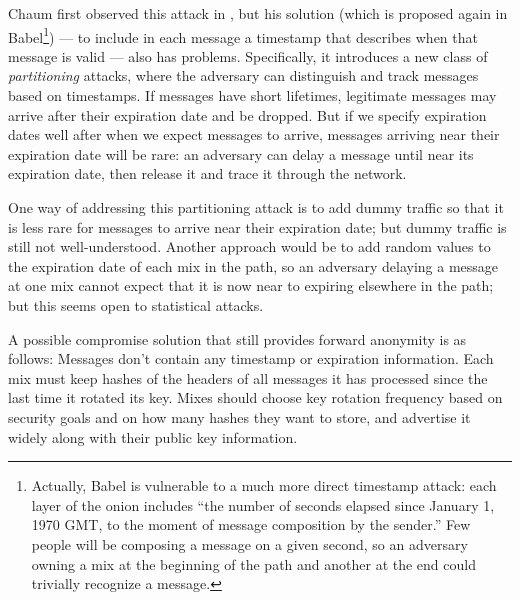 \documentclass[11pt]{IEEEtran}
\begin{document}
Chaum first observed this attack in \cite{chaum-mix},
but his solution (which is proposed again in Babel\footnote{
  Actually, Babel is vulnerable to a much more direct timestamp attack:
  each layer of the onion includes ``the number of seconds
  elapsed since January 1, 1970 GMT, to the moment of message composition
  by the sender.'' Few people will be composing a message on a given
  second, so an adversary owning a mix at the beginning of the path and
  another at the end could trivially recognize a message.
}) --- to include in each message a timestamp that describes when that message
is valid --- also has problems. Specifically, it introduces a new class
of \emph{partitioning} attacks, where the adversary can distinguish and
track messages based on timestamps. If messages have short lifetimes,
legitimate messages may arrive after their expiration date and be
dropped. But if we specify expiration dates well after when we expect
messages to arrive, messages arriving near their expiration date will be
rare: an adversary can delay a message until near its expiration date,
then release it and trace it through the network.


One way of addressing this partitioning attack is to add dummy traffic
so that it is less rare for messages to arrive near their expiration date;
but dummy traffic is still not well-understood. Another approach would
be to add random values to the expiration date of each mix in the path,
so an adversary delaying a message at one mix cannot expect that it
is now near to expiring elsewhere in the path; but this seems open to
statistical attacks.


A possible compromise solution that still provides forward anonymity
is as follows:  Messages don't
contain any timestamp or expiration information. Each mix must keep
hashes of the headers of all messages it has processed since the last time
it rotated its key. Mixes should choose key rotation frequency based on
security goals and on how many hashes they want to store, and
advertise it widely along with their public key information.
\end{document}
